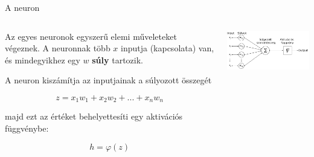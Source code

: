 \documentclass[english, aspectratio=169]{beamer}
\begin{document}
\begin{frame}{A neuron}
\begin{columns}
\begin{column}{.4\textwidth}
Az egyes neuronok egyszerű elemi műveleteket végeznek. A neuronnak több $x$ inputja (kapcsolata) van, és mindegyikhez egy $w$ \textbf{súly} tartozik.\par\smallskip
A neuron kiszámítja az inputjainak a súlyozott összegét 
\begin{block}{}
\vspace{-0.5cm}
\[
z=x_1w_1 + x_2w_2 + ... + x_nw_n
\]
\end{block}
majd ezt az értéket behelyettesíti egy aktivációs függvénybe:
\begin{block}{}
\vspace{-0.1cm}
\[
h=\varphi(z)
\]
\end{block}
\end{column}
\begin{column}{.6\textwidth}
\begin{center}
\includegraphics[width=9cm, keepaspectratio]{../../5_ql/doc/images/ql_21.png}
\end{center}
\end{column}
\end{columns}
\end{frame}
\end{document}
